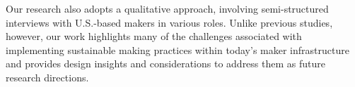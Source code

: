 Our research also adopts a qualitative approach, involving semi-structured interviews with U.S.-based makers in various roles. Unlike previous studies, however, our work highlights many of the challenges associated with implementing sustainable making practices within today's maker infrastructure and provides design insights and considerations to address them as future research directions.